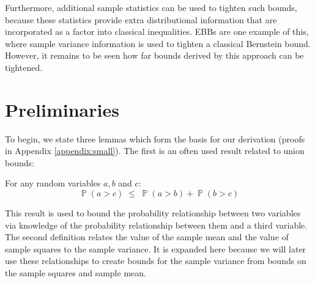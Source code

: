 \documentclass[runningheads, envcountsame, a4paper]{llncs}
\DeclareMathOperator{\p}{\mathbb{P}}
\begin{document}
Furthermore, additional sample statistics can be used to tighten such bounds, because these statistics provide extra distributional information that are incorporated as a factor into classical inequalities. 
EBBs \cite{Maurer50empiricalbernstein,10.1007/978-3-540-75225-7_15} are one example of this, where sample variance information is used to tighten a classical Bernstein bound.
However, it remains to be seen how far bounds derived by this approach can be tightened.



\section{Preliminaries}\label{sec:preliminaries}

To begin, we state three lemmas which form the basis for our derivation (proofs in Appendix \ref{appendix:small}).
The first is an often used result related to union bounds:

\begin{lemma}\label{prob_union}
For any random variables $a,b$ and $c$:
\[\p(a>c) \; \le \; \p(a>b) + \p(b>c)\]
\end{lemma}

This result is used to bound the probability relationship between two variables via knowledge of the probability relationship between them and a third variable.
%
The second definition relates the value of the sample mean and the value of sample squares to the sample variance. It is expanded here because we will later use these relationships to create bounds for the sample variance from bounds on the sample squares and sample mean.
\end{document}
